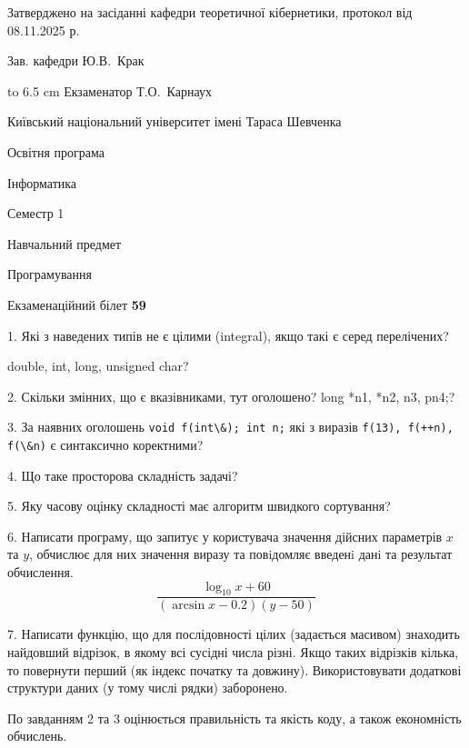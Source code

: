 \documentclass[12pt, ukrainian]{article}
\def\code#1{\Verb!#1!}
\begin{document}
{\smallskip\smallskip \begin {scriptsize} Затверджено на засіданні кафедри теоретичної кібернетики, протокол   від   08.11.2025 р.\par\smallskip\smallskip\smallskip\smallskip
{\parbox {6.5 cm} {Зав. кафедри \dotfill Ю.В.~Крак}}\hspace {0.7cm} {\hbox to 6.5 cm { Екзаменатор \dotfill Т.О.~Карнаух}} \end{scriptsize}}
\newpage
{{\begin {scriptsize}\par
{ \center  Київський національний університет імені Тараса Шевченка \par}
{\parbox {5 cm}{Освітня програма \hfill}{\parbox {7 cm}{Інформатика\hfill}}\parbox {6 cm}{\hfill Семестр 1}}\par
{\parbox {5 cm} {Навчальний предмет \hfill}\parbox {7 cm}{Програмування \hfill}\parbox {6cm}{\hfill}\par}\vspace{-15pt} \end{scriptsize}}{\center Екзаменаційний білет \No \textbf { 59 }\par}}
{%
1. Які з наведених типів не є цілими (integral), якщо такі є серед перелічених?

double, int, long, unsigned char?
\par
\vspace{2mm}
2. Скільки змінних, що є вказівниками, тут оголошено?
long *n1, *n2, n3, pn4;?
\par
\vspace{2mm}
3. За наявних оголошень \code{void f(int\&); int n;} які з виразів \code{f(13), f(++n), f(\&n)} є синтаксично коректними?
\par
\vspace{2mm}
4. Що таке просторова складність задачі?
\par
\vspace{2mm}
5. Яку часову оцінку складності має алгоритм швидкого сортування?
\par
\vspace{2mm}
6. Написати програму, що запитує у користувача значення дійсних параметрів $x$ та $y$, обчислює для них значення виразу та повiдомляє введенi данi та результат обчислення.
$$\frac{\log_{10} x + 60}{(\arcsin x - 0.2) (y - 50)}$$ 

\par
7. Написати функцію, що для послідовності цілих (задається масивом) знаходить найдовший відрізок, в якому всі сусідні числа різні. Якщо таких відрізків кілька, то повернути перший (як індекс початку та довжину). Використовувати додаткові структури даних (у тому числі рядки) заборонено.

По завданням 2 та 3 оцінюється правильність та якість коду, а також економність обчислень.

}
\end{document}

